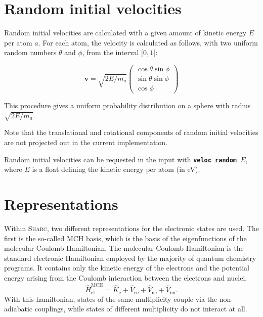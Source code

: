 \documentclass[a4paper,11pt,DIV=15,openany,twoside=false]{scrbook}
\newcommand{\tthdump}[1]{#1}
\newcommand{\sharc}{\textsc{Sharc}}
\newcommand{\ttt}[1]{\textbf{\texttt{#1}}}
\newcommand{\VEC}[1]{\ensuremath{\mathbf{#1}}}
\begin{document}
\section{Random initial velocities}\label{met:veloc}

Random initial velocities are calculated with a given amount of kinetic energy $E$ per atom $a$. For each atom, the velocity is calculated as follows, with two uniform random numbers $\theta$ and $\phi$, from the interval $[0,1[$:
\tthdump{
  \begin{equation}
    \VEC{v}=\sqrt{2E/m_a}
    \begin{pmatrix}
      \cos{\theta}\sin{\phi}\\
      \sin{\theta}\sin{\phi}\\
      \cos{\phi}
    \end{pmatrix}
  \end{equation}
}
This procedure gives a uniform probability distribution on a sphere with radius $\sqrt{2E/m_a}$.

Note that the translational and rotational components of random initial velocities are not projected out in the current implementation.

Random initial velocities can be requested in the input with \ttt{veloc random $E$}, where $E$ is a float defining the kinetic energy per atom (in eV).


\section{Representations}\label{sec:repr}

Within \sharc, two different representations for the electronic states are used. The first is the so-called MCH basis, which is the basis of the eigenfunctions of the molecular Coulomb Hamiltonian. The molecular Coulomb Hamiltonian is the standard electronic Hamiltonian employed by the majority of quantum chemistry programs. It contains only the kinetic energy of the electrons and the potential energy arising from the Coulomb interaction between the electrons and nuclei.
\begin{equation}
  \hat{H}_{\text{el}}^{\text{MCH}}
  =\hat{K}_{\text{e}}
  +\hat{V}_{\text{ee}}
  +\hat{V}_{\text{ne}}
  +\hat{V}_{\text{nn}}.
\end{equation}
With this hamiltonian, states of the same multiplicity couple via the non-adiabatic couplings, while states of different multiplicity do not interact at all. 
\end{document}
